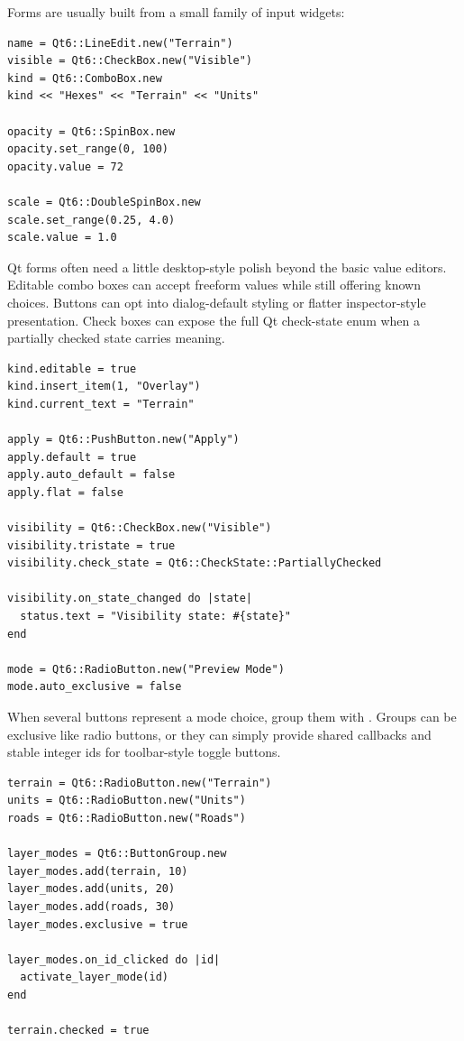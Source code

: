 Forms are usually built from a small family of input widgets:

\begin{lstlisting}[style=crystal]
name = Qt6::LineEdit.new("Terrain")
visible = Qt6::CheckBox.new("Visible")
kind = Qt6::ComboBox.new
kind << "Hexes" << "Terrain" << "Units"

opacity = Qt6::SpinBox.new
opacity.set_range(0, 100)
opacity.value = 72

scale = Qt6::DoubleSpinBox.new
scale.set_range(0.25, 4.0)
scale.value = 1.0
\end{lstlisting}

Qt forms often need a little desktop-style polish beyond the basic value editors. Editable combo boxes can accept freeform values while still offering known choices. Buttons can opt into dialog-default styling or flatter inspector-style presentation. Check boxes can expose the full Qt check-state enum when a partially checked state carries meaning.

\begin{lstlisting}[style=crystal]
kind.editable = true
kind.insert_item(1, "Overlay")
kind.current_text = "Terrain"

apply = Qt6::PushButton.new("Apply")
apply.default = true
apply.auto_default = false
apply.flat = false

visibility = Qt6::CheckBox.new("Visible")
visibility.tristate = true
visibility.check_state = Qt6::CheckState::PartiallyChecked

visibility.on_state_changed do |state|
  status.text = "Visibility state: #{state}"
end

mode = Qt6::RadioButton.new("Preview Mode")
mode.auto_exclusive = false
\end{lstlisting}

When several buttons represent a mode choice, group them with . Groups can be exclusive like radio buttons, or they can simply provide shared callbacks and stable integer ids for toolbar-style toggle buttons.

\begin{lstlisting}[style=crystal]
terrain = Qt6::RadioButton.new("Terrain")
units = Qt6::RadioButton.new("Units")
roads = Qt6::RadioButton.new("Roads")

layer_modes = Qt6::ButtonGroup.new
layer_modes.add(terrain, 10)
layer_modes.add(units, 20)
layer_modes.add(roads, 30)
layer_modes.exclusive = true

layer_modes.on_id_clicked do |id|
  activate_layer_mode(id)
end

terrain.checked = true
\end{lstlisting}

